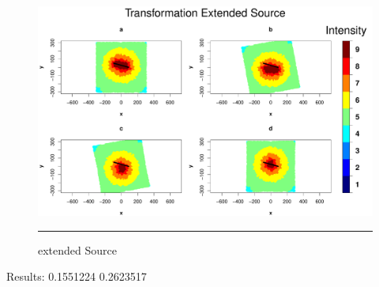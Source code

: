 \begin{figure}[!htpb]
    \centering
		\includegraphics[scale=0.35]{Figures/extendedSource.pdf}
		\rule{35em}{0.5pt}
	\caption[extended Source]{extended Source}
	\label{fig:extendedSource}
\end{figure}

Results: 0.1551224 0.2623517 
